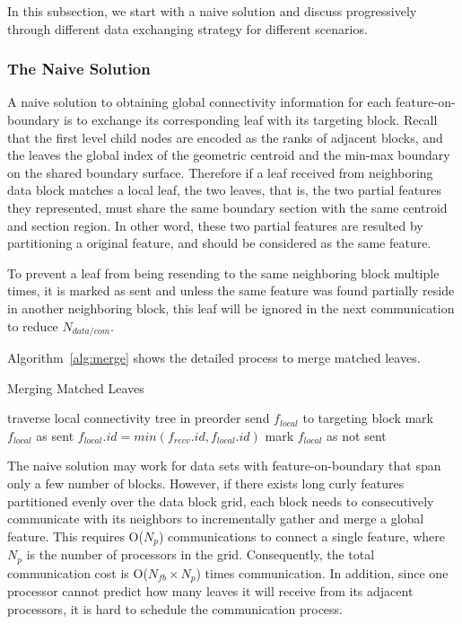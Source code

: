 \documentclass[10pt, conference, compsocconf]{IEEEtran}
\begin{document}
In this subsection, we start with a naive solution and discuss progressively through different data exchanging strategy for different scenarios.

\subsubsection{The Naive Solution}

A naive solution to obtaining global connectivity information for each feature-on-boundary is to exchange its corresponding leaf with its targeting block. Recall that the first level child nodes are encoded as the ranks of adjacent blocks, and the leaves the global index of the geometric centroid and the min-max boundary on the shared boundary surface. Therefore if a leaf received from neighboring data block matches a local leaf, the two leaves, that is, the two partial features they represented, must share the same boundary section with the same centroid and section region. In other word, these two partial features are resulted by partitioning a original feature, and should be considered as the same feature.

To prevent a leaf from being resending to the same neighboring block multiple times, it is marked as sent and unless the same feature was found partially reside in another neighboring block, this leaf will be ignored in the next communication to reduce $N_{data/com}$.

Algorithm~\ref{alg:merge} shows the detailed process to merge matched leaves.
\begin{algorithm}
\caption{Merging Matched Leaves}
\label{alg:merge}
\begin{algorithmic}
\STATE traverse local connectivity tree in preorder
		\STATE send $f_{local}$ to targeting block
	\ENDIF
	\STATE mark $f_{local}$ as sent
\ENDFOR
{}
			\STATE $f_{local}.id = min(f_{recv}.id, f_{local}.id)$
			\STATE mark $f_{local}$ as not sent
		\ENDIF
	\ENDFOR	
\ENDFOR
\end{algorithmic}
\end{algorithm}

The naive solution may work for data sets with feature-on-boundary that span only a few number of blocks. However, if there exists long curly features partitioned evenly over the data block grid, each block needs to consecutively communicate with its neighbors to incrementally gather and merge a global feature. This requires O(${N_p}$) communications to connect a single feature, where ${N_p}$ is the number of processors in the grid. Consequently, the total communication cost is O(${N_{fb} \times N_p}$) times communication. In addition, since one processor cannot predict how many leaves it will receive from its adjacent processors, it is hard to schedule the communication process.
\end{document}

